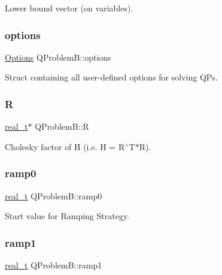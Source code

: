 Lower bound vector (on variables). \mbox{\label{class_q_problem_b_a59d8ee93443bc8e7ce509a94ff4330e6}} 
\subsubsection{\texorpdfstring{options}{options}}
{\footnotesize\ttfamily \hyperlink{class_options}{Options} Q\+Problem\+B\+::options\hspace{0.3cm}{\ttfamily [protected]}}

Struct containing all user-\/defined options for solving Q\+Ps. \mbox{\label{class_q_problem_b_a8402fb9f4dbfaa9ad433457ba03751f0}} 
\subsubsection{\texorpdfstring{R}{R}}
{\footnotesize\ttfamily \hyperlink{qp_o_a_s_e_s__wrapper_8h_a0d00e2b3dfadee81331bbb39068570c4}{real\+\_\+t}$\ast$ Q\+Problem\+B\+::R\hspace{0.3cm}{\ttfamily [protected]}}

Cholesky factor of H (i.\+e. H = R$^\wedge$\+T$\ast$R). \mbox{\label{class_q_problem_b_ac26a4dc4501ff1d6249631ea24e98d4c}} 
\subsubsection{\texorpdfstring{ramp0}{ramp0}}
{\footnotesize\ttfamily \hyperlink{qp_o_a_s_e_s__wrapper_8h_a0d00e2b3dfadee81331bbb39068570c4}{real\+\_\+t} Q\+Problem\+B\+::ramp0\hspace{0.3cm}{\ttfamily [protected]}}

Start value for Ramping Strategy. \mbox{\label{class_q_problem_b_ac3741a9c8073cbb90b2fa071f10930b6}} 
\subsubsection{\texorpdfstring{ramp1}{ramp1}}
{\footnotesize\ttfamily \hyperlink{qp_o_a_s_e_s__wrapper_8h_a0d00e2b3dfadee81331bbb39068570c4}{real\+\_\+t} Q\+Problem\+B\+::ramp1\hspace{0.3cm}{\ttfamily [protected]}}

